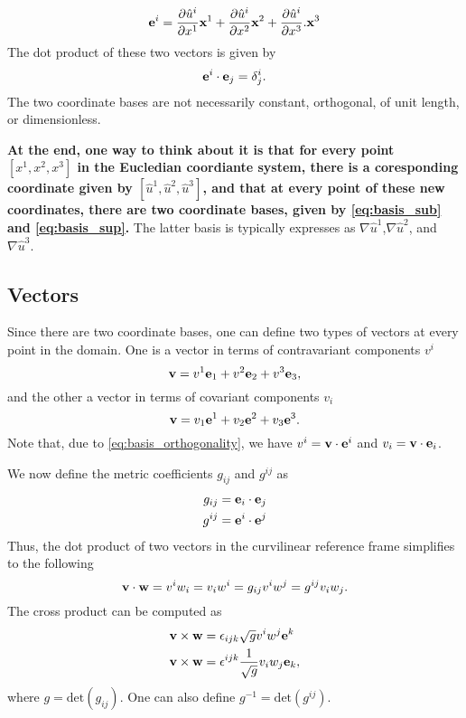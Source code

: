 \documentclass[11pt]{article}
\newcommand{\uhat}{\hat{u}}
\begin{document}
\begin{equation}
\label{eq:basis_sup}
    \evec^i = \frac{ \partial \uhat^i}{\partial x^1} \xvec^1 + \frac{ \partial \uhat^i}{\partial x^2} \xvec^2 + \frac{ \partial \uhat^i}{\partial x^3}. \xvec^3
\end{equation}
The dot product of these two vectors is given by
\begin{equation}
\label{eq:basis_orthogonality}
    \mathbf{e}^i \cdot \mathbf{e}_j = \delta^i_j.
\end{equation}
The two coordinate bases are not necessarily constant, orthogonal, of unit length, or dimensionless.

\textbf{At the end, one way to think about it is that for every point $[x^1,x^2,x^3]$ in the Eucledian coordiante system, there is a coresponding coordinate given by $[\uhat^1,\uhat^2,\uhat^3]$, and that at every point of these new coordinates, there are two coordinate bases, given by \cref{eq:basis_sub} and \cref{eq:basis_sup}.} The latter basis is typically expresses as $\nabla \uhat^1$,$\nabla \uhat^2$, and $\nabla \uhat^3$.

\subsection{Vectors}
Since there are two coordinate bases, one can define two types of vectors at every point in the domain. One is a vector in terms of contravariant components $v^i$ 
\begin{equation}
    \mathbf{v} = v^1 \mathbf{e}_1 + v^2 \mathbf{e}_2 + v^3 \mathbf{e}_3,
\end{equation}
and the other a vector in terms of covariant components $v_i$
\begin{equation}
    \mathbf{v} = v_1 \mathbf{e}^1 + v_2 \mathbf{e}^2 + v_3 \mathbf{e}^3.
\end{equation}
Note that, due to \cref{eq:basis_orthogonality}, we have $v^i = \mathbf{v} \cdot \mathbf{e}^i$ and $v_i = \mathbf{v} \cdot \mathbf{e}_i$.

We now define the metric coefficients $g_{ij}$ and $g^{ij}$ as
\begin{align}
    g_{ij} &= \mathbf{e}_i \cdot \mathbf{e}_j \\
    g^{ij} &= \mathbf{e}^i \cdot \mathbf{e}^j \\
\end{align}
Thus, the dot product of two vectors in the curvilinear reference frame simplifies to the following
\begin{equation}
\mathbf{v} \cdot \mathbf{w} = v^i w_i = v_i w^i = g_{ij} v^i w^j = g^{ij} v_i w_j.
\end{equation}
The cross product can be computed as
\begin{align}
    \mathbf{v} \times \mathbf{w} &= \epsilon_{ijk} \sqrt{g} v^i w^j \mathbf{e}^k \\
    \mathbf{v} \times \mathbf{w} &= \epsilon^{ijk} \frac{1}{\sqrt{g}} v_i w_j \mathbf{e}_k,
\end{align}
where $g = \text{det}(g_{ij})$. One can also define $g^{-1} = \text{det}(g^{ij})$.
\end{document}

